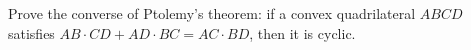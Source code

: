 Prove the converse of Ptolemy's theorem: if a convex quadrilateral $ABCD$ satisfies $AB\cdot CD+AD\cdot BC=AC\cdot BD$, then it is cyclic.
